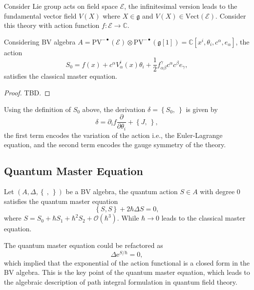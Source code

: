 \documentclass[10pt]{article}
\begin{document}
\begin{example}
  Consider Lie group acts on field space $ \mathcal{E}$, the infinitesimal version leads to the fundamental vector field $ V(X)$ where $ X \in \mathfrak{g}$ and $ V(X) \in \mathrm{Vect}(\mathcal{E})$.
  Consider this theory with action function $ f: \mathcal{E} \rightarrow \mathbb{C}$.

  Considering BV algebra $ A = \mathrm{PV}^{-\bullet}(\mathcal{E}) \otimes \mathrm{PV}^{- \bullet}(\mathfrak{g}[1]) = \mathbb{C}[x^{i}, \theta_{i}, c^{\alpha}, e_{\alpha}]$, the action
  \begin{equation*}
    S_0 = f(x) + c^{\alpha} V_{\alpha}^{i}(x) \theta_{i} + \frac{1}{2} f_{\alpha \beta}^{\gamma} c^{\alpha} c^{\beta} e_{\gamma},
  \end{equation*}
  satisfies the classical master equation.
  \begin{proof}
    TBD.
  \end{proof}
  Using the definition of $ S_0 $ above, the derivation $ \delta = \left\{ S_0, ~ \right\}$ is given by
  \begin{equation*}
    \delta = \partial_{i} f \frac{\partial }{\partial \theta_{i}} + \left\{ J, ~ \right\},
  \end{equation*}
  the first term encodes the variation of the action i.e., the Euler-Lagrange equation, and the second term encodes the gauge symmetry of the theory.
\end{example}

\subsection{Quantum Master Equation}

\begin{definition}
  Let $(A, \Delta , \left\{ ~,~ \right\})$ be a BV algebra, the quantum action $ S \in A$ with degree $ 0$ satisfies the quantum master equation
  \begin{equation*}
    \left\{ S, S \right\} + 2 \hbar \Delta S = 0,
  \end{equation*}
  where $ S = S_0 + \hbar S_1 + \hbar^{2} S_2 + \mathcal{O}(\hbar^{3})$. While $ \hbar \rightarrow 0$ leads to the classical master equation.
\end{definition}

The quantum master equation could be refactored as
\begin{equation*}
  \Delta \mathrm{e}^{{S}/{\hbar}} = 0,
\end{equation*}
which implied that the exponential of the action functional is a closed form in the BV algebra.
This is the key point of the quantum master equation, which leads to the algebraic description of path integral formulation in quantum field theory.
\end{document}
